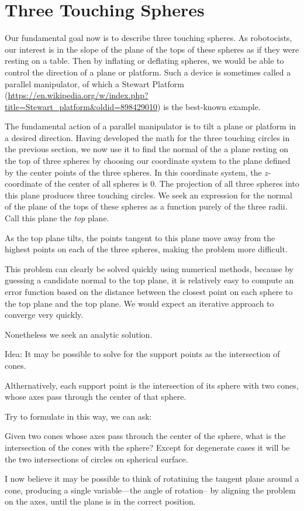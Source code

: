 \documentclass{article}
\begin{document}
\section{Three Touching Spheres}

Our fundamental goal now is to describe three touching spheres. As robotocists,
our interest is in the slope of the plane of the tops of these spheres
as if they were resting on a table. Then by inflating or deflating spheres,
we would be able to control the direction of a plane or platform.
Such a device is sometimes called a parallel manipulator, of which a
Stewart Platform\cite{wiki:stewart} (\url{https://en.wikipedia.org/w/index.php?title=Stewart_platform&oldid=898429010})
is the best-known example.

The fundamental action of a parallel manipulator is to tilt a plane or platform in a desired direction.
Having developed the math for the three touching circles in the previous section, we now use it
to find the normal of the a plane resting on the top of three spheres by choosing our
coordinate system to the plane defined by the center points of the three spheres.
In this coordinate system, the $z$-coordinate of the center of all spheres is $0$.
The projection of all three spheres into this plane produces three touching circles.
We seek an expression for the normal of the plane of the tops of these spheres as a function
purely of the three radii. Call this plane the {\em top} plane.

As the top plane tilts, the points tangent to this plane move away from the highest points on each of
the three spheres, making the problem more difficult.

This problem can clearly be solved quickly using numerical methods, because by guessing
a candidate normal to the top plane, it is relatively easy to compute an error function based
on the distance between the closest point on each sphere to the top plane and the top plane.
We would expect an iterative approach to converge very quickly.

Nonetheless we seek an analytic solution.


Idea: It may be possible to solve for the support points as the intersection of cones\cite{shene1994lower}.

Althernatively, each support point is the intersection of its sphere
with two cones, whose axes pass through the center of that
sphere.

Try to formulate in this way, we can ask:

Given two cones whose axes pass throuch the center of the sphere,
what is the intersection of the cones with the sphere? Except for
degenerate cases it will be the two intersections of circles on
spherical surface.

I now believe it may be possible to think of rotatining the tangent plane
around a cone, producing a single variable---the angle of rotation--
by aligning the problem on the axes, until the plane is in the correct
position.




\end{document}
